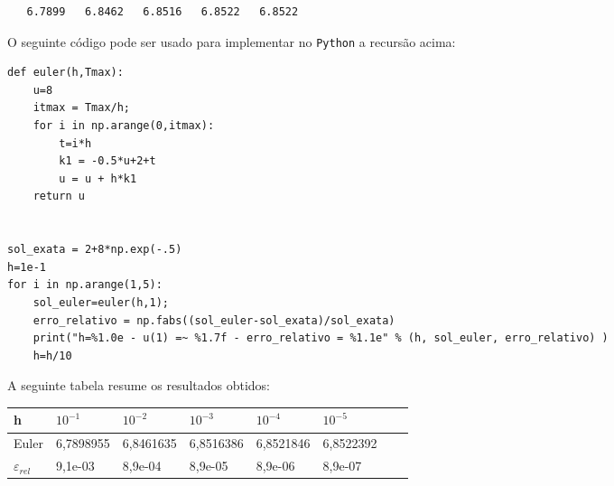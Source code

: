 \begin{resol}
\begin{verbatim}
   6.7899   6.8462   6.8516   6.8522   6.8522
\end{verbatim}
\fi


\ifispython
O seguinte código pode ser usado para implementar no \verb+Python+ a recursão acima:

\begin{verbatim}
def euler(h,Tmax):
	u=8
  	itmax = Tmax/h;
	for i in np.arange(0,itmax):
		t=i*h
		k1 = -0.5*u+2+t
		u = u + h*k1
	return u

	
sol_exata = 2+8*np.exp(-.5)
h=1e-1
for i in np.arange(1,5):
	sol_euler=euler(h,1);
	erro_relativo = np.fabs((sol_euler-sol_exata)/sol_exata)
	print("h=%1.0e - u(1) =~ %1.7f - erro_relativo = %1.1e" % (h, sol_euler, erro_relativo) )
	h=h/10
\end{verbatim}
\fi
A seguinte tabela resume os resultados obtidos:
\begin{center}
 \begin{tabular}{|l|l|l|l|l|l|l|l|}%
\hline
   h&$10^{-1}$&$10^{-2}$&$10^{-3}$&$10^{-4}$&$10^{-5}$\\
   \hline
  Euler & 6,7898955 &  6,8461635  &  6,8516386  &  6,8521846  &  6,8522392  \\
   \hline
   $\varepsilon_{rel}$ &9,1e-03 &  8,9e-04  & 8,9e-05&   8,9e-06 &  8,9e-07\\
    \hline
  \end{tabular}
\end{center}



\end{resol}


